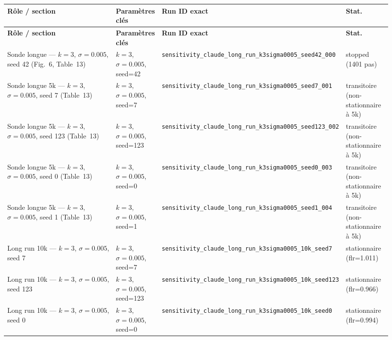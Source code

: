 \begin{longtable}{p{0.30\linewidth}p{0.10\linewidth}p{0.40\linewidth}p{0.12\linewidth}}
\hline
\textbf{Rôle / section} & \textbf{Paramètres clés} & \textbf{Run ID exact} & \textbf{Stat.} \\
\hline
\endfirsthead
\hline
\textbf{Rôle / section} & \textbf{Paramètres clés} & \textbf{Run ID exact} & \textbf{Stat.} \\
\hline
\endhead
\hline
\endfoot

Sonde longue — $k=3$, $\sigma=0.005$, seed 42 (Fig.~6, Table~13)
 & $k=3$, $\sigma=0.005$, seed=42
 & \texttt{sensitivity\_claude\_long\_run\_k3sigma0005\_seed42\_000}
 & stopped (1401 pas) \\

Sonde longue 5k — $k=3$, $\sigma=0.005$, seed 7 (Table~13)
 & $k=3$, $\sigma=0.005$, seed=7
 & \texttt{sensitivity\_claude\_long\_run\_k3sigma0005\_seed7\_001}
 & transitoire (non-stationnaire à 5k) \\

Sonde longue 5k — $k=3$, $\sigma=0.005$, seed 123 (Table~13)
 & $k=3$, $\sigma=0.005$, seed=123
 & \texttt{sensitivity\_claude\_long\_run\_k3sigma0005\_seed123\_002}
 & transitoire (non-stationnaire à 5k) \\

Sonde longue 5k — $k=3$, $\sigma=0.005$, seed 0 (Table~13)
 & $k=3$, $\sigma=0.005$, seed=0
 & \texttt{sensitivity\_claude\_long\_run\_k3sigma0005\_seed0\_003}
 & transitoire (non-stationnaire à 5k) \\

Sonde longue 5k — $k=3$, $\sigma=0.005$, seed 1 (Table~13)
 & $k=3$, $\sigma=0.005$, seed=1
 & \texttt{sensitivity\_claude\_long\_run\_k3sigma0005\_seed1\_004}
 & transitoire (non-stationnaire à 5k) \\

Long run 10k — $k=3$, $\sigma=0.005$, seed 7
 & $k=3$, $\sigma=0.005$, seed=7
 & \texttt{sensitivity\_claude\_long\_run\_k3sigma0005\_10k\_seed7}
 & stationnaire (flr=1.011) \\

Long run 10k — $k=3$, $\sigma=0.005$, seed 123
 & $k=3$, $\sigma=0.005$, seed=123
 & \texttt{sensitivity\_claude\_long\_run\_k3sigma0005\_10k\_seed123}
 & stationnaire (flr=0.966) \\

Long run 10k — $k=3$, $\sigma=0.005$, seed 0
 & $k=3$, $\sigma=0.005$, seed=0
 & \texttt{sensitivity\_claude\_long\_run\_k3sigma0005\_10k\_seed0}
 & stationnaire (flr=0.994) \\


\end{longtable}

